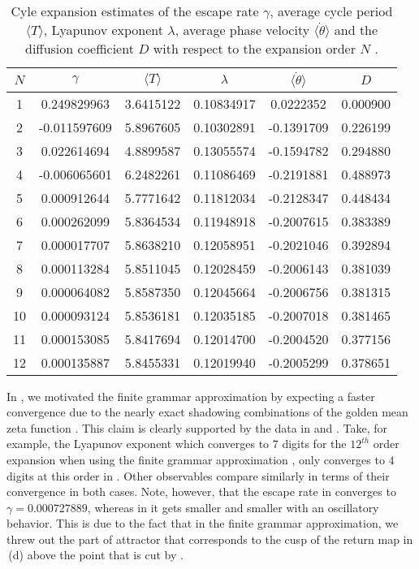 \documentclass[aip,cha,
reprint,
secnumarabic,
nofootinbib, tightenlines,
nobibnotes, showkeys, showpacs,
superscriptaddress,
]{revtex4-1}
\begin{document}
{\begin{table}
	\begin{tabular}{c|c|c|c|c|c}
	 $N$ & $\gamma$ & $\langle T \rangle$ & $\lambda$ & $\langle \dot{\theta} \rangle$ & $D$ \\ 
	\hline
	1 & 0.249829963 & 3.6415122 & 0.10834917 & 0.0222352 & 0.000900 \\ 
 	2 & -0.011597609 & 5.8967605 & 0.10302891 & -0.1391709 & 0.226199 \\ 
 	3 & 0.022614694 & 4.8899587 & 0.13055574 & -0.1594782 & 0.294880 \\ 
 	4 & -0.006065601 & 6.2482261 & 0.11086469 & -0.2191881 & 0.488973 \\ 
 	5 & 0.000912644 & 5.7771642 & 0.11812034 & -0.2128347 & 0.448434 \\ 
 	6 & 0.000262099 & 5.8364534 & 0.11948918 & -0.2007615 & 0.383389 \\ 
 	7 & 0.000017707 & 5.8638210 & 0.12058951 & -0.2021046 & 0.392894 \\ 
 	8 & 0.000113284 & 5.8511045 & 0.12028459 & -0.2006143 & 0.381039 \\ 
 	9 & 0.000064082 & 5.8587350 & 0.12045664 & -0.2006756 & 0.381315 \\ 
 	10 & 0.000093124 & 5.8536181 & 0.12035185 & -0.2007018 & 0.381465 \\ 
 	11 & 0.000153085 & 5.8417694 & 0.12014700 & -0.2004520 & 0.377156 \\ 
 	12 & 0.000135887 & 5.8455331 & 0.12019940 & -0.2005299 & 0.378651 \\ 
 	\end{tabular}
	\caption{Cyle expansion estimates of the escape rate $\gamma$, average 
    cycle period $\langle T \rangle$, Lyapunov exponent $\lambda$, average 
    phase velocity $\langle \dot{\theta} \rangle$ and the diffusion coefficient 
    $D$ with respect to the expansion order $N$ .}
	\label{t-DynamicalAveragesNoGrammar}
\end{table}

In , we motivated the finite grammar 
approximation by expecting a faster convergence due to the nearly 
exact shadowing combinations of the golden mean zeta function 
. This claim is clearly 
supported by the data in  and 
. Take, for example, the 
Lyapunov exponent which converges to $7$ digits for the $12^{th}$ 
order expansion when using the finite grammar approximation 
, only converges to $4$ digits at this 
order in . Other observables 
compare similarly in terms of their convergence in both cases. 
Note, however, that the escape rate in  
converges to $\gamma = 0.000727889$, whereas 
in  it gets smaller and 
smaller with an oscillatory behavior. This is due to the fact that 
in the finite grammar approximation, we threw out the part of 
attractor that corresponds to the cusp of the return map in 
\,(d) above the point that is cut by 
.

}
\end{document}
